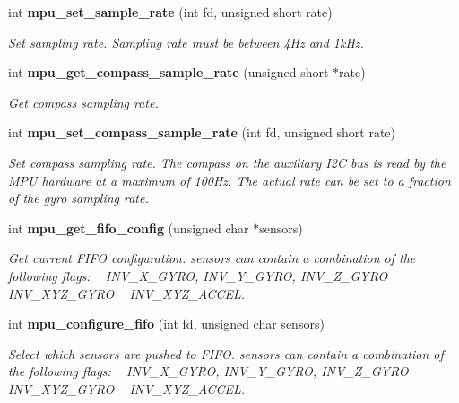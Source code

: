 \begin{DoxyCompactItemize}
int \textbf{ mpu\+\_\+set\+\_\+sample\+\_\+rate} (int fd, unsigned short rate)
\begin{DoxyCompactList}\small\item\em Set sampling rate. Sampling rate must be between 4\+Hz and 1k\+Hz. \end{DoxyCompactList}\item 
int \textbf{ mpu\+\_\+get\+\_\+compass\+\_\+sample\+\_\+rate} (unsigned short $\ast$rate)
\begin{DoxyCompactList}\small\item\em Get compass sampling rate. \end{DoxyCompactList}\item 
int \textbf{ mpu\+\_\+set\+\_\+compass\+\_\+sample\+\_\+rate} (int fd, unsigned short rate)
\begin{DoxyCompactList}\small\item\em Set compass sampling rate. The compass on the auxiliary I2C bus is read by the M\+PU hardware at a maximum of 100\+Hz. The actual rate can be set to a fraction of the gyro sampling rate. \end{DoxyCompactList}\item 
int \textbf{ mpu\+\_\+get\+\_\+fifo\+\_\+config} (unsigned char $\ast$sensors)
\begin{DoxyCompactList}\small\item\em Get current F\+I\+FO configuration. {\itshape sensors} can contain a combination of the following flags\+: ~\newline
 I\+N\+V\+\_\+\+X\+\_\+\+G\+Y\+RO, I\+N\+V\+\_\+\+Y\+\_\+\+G\+Y\+RO, I\+N\+V\+\_\+\+Z\+\_\+\+G\+Y\+RO ~\newline
 I\+N\+V\+\_\+\+X\+Y\+Z\+\_\+\+G\+Y\+RO ~\newline
 I\+N\+V\+\_\+\+X\+Y\+Z\+\_\+\+A\+C\+C\+EL. \end{DoxyCompactList}\item 
int \textbf{ mpu\+\_\+configure\+\_\+fifo} (int fd, unsigned char sensors)
\begin{DoxyCompactList}\small\item\em Select which sensors are pushed to F\+I\+FO. {\itshape sensors} can contain a combination of the following flags\+: ~\newline
 I\+N\+V\+\_\+\+X\+\_\+\+G\+Y\+RO, I\+N\+V\+\_\+\+Y\+\_\+\+G\+Y\+RO, I\+N\+V\+\_\+\+Z\+\_\+\+G\+Y\+RO ~\newline
 I\+N\+V\+\_\+\+X\+Y\+Z\+\_\+\+G\+Y\+RO ~\newline
 I\+N\+V\+\_\+\+X\+Y\+Z\+\_\+\+A\+C\+C\+EL. \end{DoxyCompactList}\item 

\end{DoxyCompactItemize}
